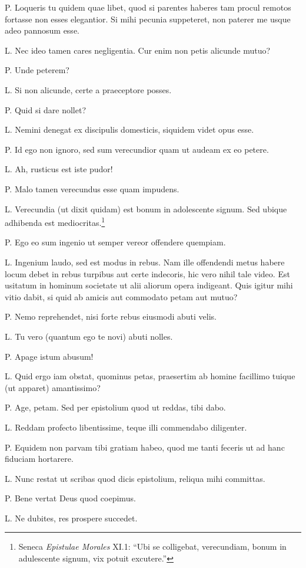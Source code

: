\documentclass{article}
\begin{document}
P. Loqueris tu quidem quae libet, quod si parentes haberes tam procul remotos fortasse non esses elegantior. Si mihi pecunia suppeteret, non paterer me usque adeo pannosum esse.

L. Nec ideo tamen cares negligentia. Cur enim non petis alicunde mutuo?

P. Unde peterem?

L. Si non alicunde, certe a praeceptore posses.

P. Quid si dare nollet?

L. Nemini denegat ex discipulis domesticis, siquidem videt opus esse.

P. Id ego non ignoro, sed sum verecundior quam ut audeam ex eo petere.

L. Ah, rusticus est iste pudor!

P. Malo tamen verecundus esse quam impudens.

L. Verecundia (ut dixit quidam) est bonum in adolescente signum. Sed ubique adhibenda est mediocritas.\footnote{Seneca \emph{Epistulae Morales} XI.1: ``Ubi se colligebat, verecundiam, bonum in adulescente signum, vix potuit excutere.''}

P. Ego eo sum ingenio ut semper vereor offendere quempiam.

L. Ingenium laudo, sed est modus in rebus. Nam ille offendendi metus habere locum debet in rebus turpibus aut certe indecoris, hic vero nihil tale video. Est usitatum in hominum societate ut alii aliorum opera indigeant. Quis igitur mihi vitio dabit, si quid ab amicis aut commodato petam aut mutuo?

P. Nemo reprehendet, nisi forte rebus eiusmodi abuti velis.

L. Tu vero (quantum ego te novi) abuti nolles.

P. Apage istum abusum!

L. Quid ergo iam obstat, quominus petas, praesertim ab homine facillimo tuique (ut apparet) amantissimo?

P. Age, petam. Sed per epistolium quod ut reddas, tibi dabo.

L. Reddam profecto libentissime, teque illi commendabo diligenter.

P. Equidem non parvam tibi gratiam habeo, quod me tanti feceris ut ad hanc fiduciam hortarere.

L. Nunc restat ut scribas quod dicis epistolium, reliqua mihi committas.

P. Bene vertat Deus quod coepimus.

L. Ne dubites, res prospere succedet.
\end{document}
